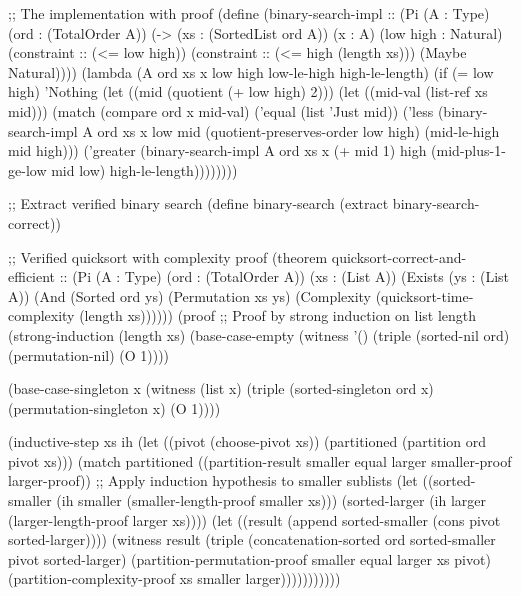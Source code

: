 \begin{example}
\begin{lambdustcode}
;; The implementation with proof
(define (binary-search-impl :: (Pi (A : Type) (ord : (TotalOrder A))
                                  (-> (xs : (SortedList ord A)) (x : A)
                                      (low high : Natural)
                                      (constraint :: (<= low high))
                                      (constraint :: (<= high (length xs)))
                                      (Maybe Natural))))
  (lambda (A ord xs x low high low-le-high high-le-length)
    (if (= low high)
        'Nothing
        (let ((mid (quotient (+ low high) 2)))
          (let ((mid-val (list-ref xs mid)))
            (match (compare ord x mid-val)
              ('equal (list 'Just mid))
              ('less (binary-search-impl A ord xs x low mid 
                       (quotient-preserves-order low high)
                       (mid-le-high mid high)))
              ('greater (binary-search-impl A ord xs x (+ mid 1) high
                          (mid-plus-1-ge-low mid low)
                          high-le-length))))))))

;; Extract verified binary search
(define binary-search (extract binary-search-correct))

;; Verified quicksort with complexity proof  
(theorem quicksort-correct-and-efficient :: 
  (Pi (A : Type) (ord : (TotalOrder A)) (xs : (List A))
      (Exists (ys : (List A))
        (And (Sorted ord ys)
             (Permutation xs ys)
             (Complexity (quicksort-time-complexity (length xs))))))
  (proof
    ;; Proof by strong induction on list length
    (strong-induction (length xs)
      (base-case-empty
        (witness '() (triple (sorted-nil ord) (permutation-nil) (O 1))))
      
      (base-case-singleton x
        (witness (list x) (triple (sorted-singleton ord x) 
                                 (permutation-singleton x)
                                 (O 1))))
      
      (inductive-step xs ih
        (let ((pivot (choose-pivot xs))
              (partitioned (partition ord pivot xs)))
          (match partitioned
            ((partition-result smaller equal larger smaller-proof larger-proof))
              ;; Apply induction hypothesis to smaller sublists
              (let ((sorted-smaller (ih smaller (smaller-length-proof smaller xs)))
                    (sorted-larger (ih larger (larger-length-proof larger xs))))
                (let ((result (append sorted-smaller (cons pivot sorted-larger))))
                  (witness result
                    (triple (concatenation-sorted ord sorted-smaller pivot sorted-larger)
                           (partition-permutation-proof smaller equal larger xs pivot)
                           (partition-complexity-proof xs smaller larger)))))))))))


\end{lambdustcode}
\end{example}
